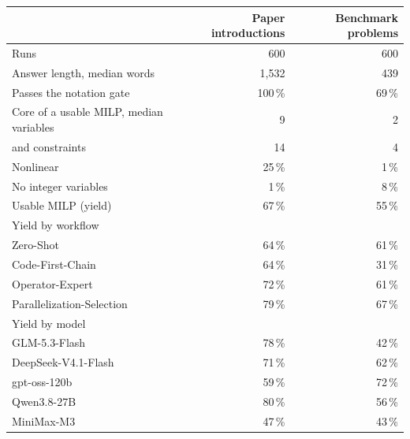 \begin{tabular}{lrr}
\toprule
& Paper introductions & Benchmark problems \\
\midrule
Runs & 600 & 600 \\
Answer length, median words & 1{,}532 & 439 \\
Passes the notation gate & 100\,\% & 69\,\% \\
Core of a usable MILP, median variables & 9 & 2 \\
\quad and constraints & 14 & 4 \\
Nonlinear & 25\,\% & 1\,\% \\
No integer variables & 1\,\% & 8\,\% \\
Usable MILP (yield) & 67\,\% & 55\,\% \\
\midrule
\multicolumn{3}{l}{Yield by workflow} \\
\quad Zero-Shot & 64\,\% & 61\,\% \\
\quad Code-First-Chain & 64\,\% & 31\,\% \\
\quad Operator-Expert & 72\,\% & 61\,\% \\
\quad Parallelization-Selection & 79\,\% & 67\,\% \\
\midrule
\multicolumn{3}{l}{Yield by model} \\
\quad GLM-5.3-Flash & 78\,\% & 42\,\% \\
\quad DeepSeek-V4.1-Flash & 71\,\% & 62\,\% \\
\quad gpt-oss-120b & 59\,\% & 72\,\% \\
\quad Qwen3.8-27B & 80\,\% & 56\,\% \\
\quad MiniMax-M3 & 47\,\% & 43\,\% \\
\bottomrule
\end{tabular}
